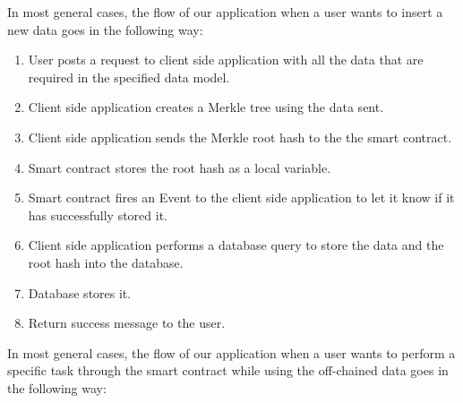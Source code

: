 In most general cases, the flow of our application when a user wants to insert a new data goes in the following way: 

\begin{enumerate}
\item User posts a request to client side application with all the data that are required in the specified data model. 
\item Client side application creates a Merkle tree using the data sent.
\item Client side application sends the Merkle root hash to the the smart contract.
\item Smart contract stores the root hash as a local variable.
\item Smart contract fires an Event to the client side application to let it know if it has successfully stored it. 
\item Client side application performs a database query to store the data and the root hash into the database.
\item Database stores it.
\item Return success message to the user. 
\end{enumerate}

In most general cases, the flow of our application when a user wants to perform a specific task through the smart contract while using the off-chained data goes in the following way:

